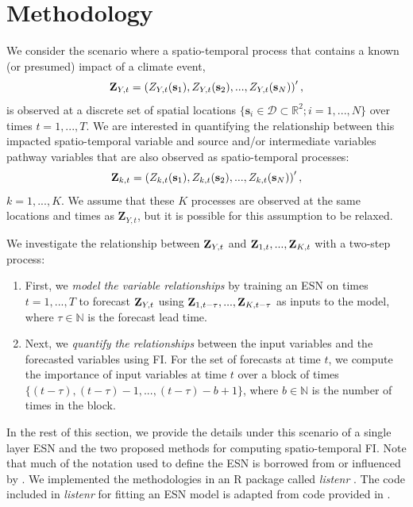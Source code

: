 \documentclass[AMS,STIX2COL]{WileyNJD-v2}
\begin{document}
\section{Methodology} \label{sec:methods}

We consider the scenario where a spatio-temporal process that contains a known (or presumed) impact of a climate event,
\begin{align}
    {\bf Z}_{Y,t} = \left(Z_{Y,t}({\bf s}_1),Z_{Y,t}({\bf s}_2),...,Z_{Y,t}({\bf s}_N)\right)',
\end{align}
is observed at a discrete set of spatial locations $\{\textbf{s}_i\in\mathcal{D}\subset\mathbb{R}^2;i=1,...,N\}$ over times $t=1,...,T$. We are interested in quantifying the relationship between this impacted spatio-temporal variable and source and/or intermediate variables pathway variables that are also observed as spatio-temporal processes:
\begin{align}
    {\bf Z}_{k,t} = \left(Z_{k,t}({\bf s}_1),Z_{k,t}({\bf s}_2),...,Z_{k,t}({\bf s}_N)\right)',
\end{align} 
$k=1,...,K$. We assume that these $K$ processes are observed at the same locations and times as $\textbf{Z}_{Y,t}$, but it is possible for this assumption to be relaxed. 

We investigate the relationship between ${\bf Z}_{Y,t}$ and ${\bf Z}_{1,t},...,{\bf Z}_{K,t}$ with a two-step process:

\begin{enumerate}
    \item First, we \emph{model the variable relationships} by training an ESN on times $t=1,...,T$ to forecast ${\bf Z}_{Y,t}$ using ${\bf Z}_{1,t-\tau},...,{\bf Z}_{K,t-\tau}$ as inputs to the model, where $\tau\in\mathbb{N}$ is the forecast lead time.
    \item Next, we \emph{quantify the relationships} between the input variables and the forecasted variables using FI. For the set of forecasts at time $t$, we compute the importance of input variables at time $t$ over a block of times $\{(t-\tau), (t-\tau)-1,...,(t-\tau)-b+1\}$, where $b\in\mathbb{N}$ is the number of times in the block.
\end{enumerate}

In the rest of this section, we provide the details under this scenario of a single layer ESN and the two proposed methods for computing spatio-temporal FI. Note that much of the notation used to define the ESN is borrowed from or influenced by \citet{mcdermott2019}. We implemented the methodologies in an R package called \emph{listenr} \citep{goode2024}. The code included in \emph{listenr} for fitting an ESN model is adapted from code provided in \citet{wikle2019}.
\end{document}
